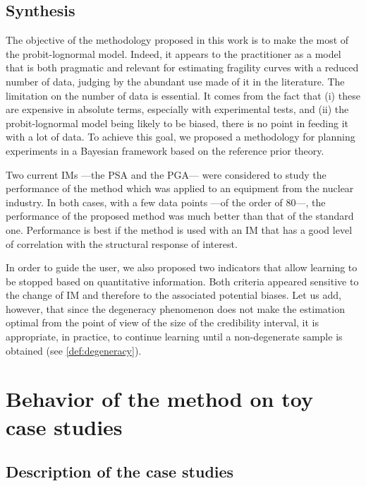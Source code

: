     \subsection{Synthesis}




    The objective of the methodology proposed in this work is to make the most of the {probit-}lognormal model. Indeed, it appears to the practitioner as a model that is both pragmatic and relevant for estimating fragility curves with a reduced number of data, judging by the abundant use made of it in the literature. The {limitation} on the number of data is essential. It comes from the fact that (i) these are expensive in absolute terms, especially %
with experimental tests, and (ii) the {probit-}lognormal model being likely to be biased, there is no point in feeding it with a lot of data. To achieve this goal, we proposed a methodology for planning experiments in a Bayesian framework based on the reference prior theory.

Two current IMs ---the PSA and the PGA--- were considered to study the performance of the method which was applied to an equipment from the nuclear industry. In both cases, with a few data points ---of the order of 80---, the performance of the proposed method was much better than that of the standard one. Performance is best if the method is used with an IM that has a good level of correlation with the structural response of interest.

In order to guide the user, we also proposed two indicators that allow learning to be stopped based on quantitative information. Both criteria appeared sensitive to the change of IM and therefore to the associated potential biases. Let us add, however, that since the degeneracy phenomenon does not make the estimation optimal from the point of view of the size of the credibility interval, it is appropriate, in practice, to continue learning until a non-degenerate sample is obtained (see \cref{def:degeneracy}).



\section{Behavior of the method on toy case studies}\label{app:doe:toycases}

    \subsection{Description of the case studies}
    


